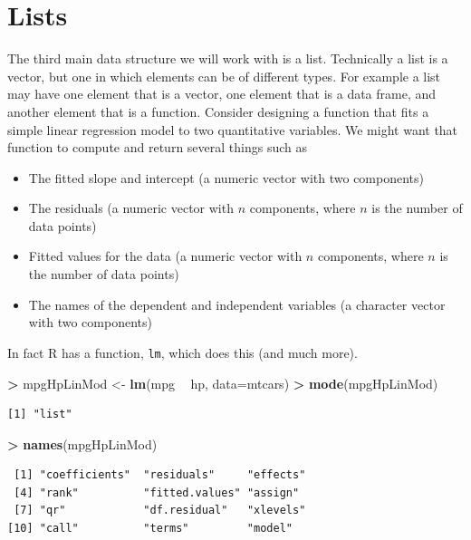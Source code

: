 \documentclass[]{krantz}
\makeatletter
\newenvironment{Shaded}{\begin{snugshade}}{\end{snugshade}}
\newcommand{\KeywordTok}[1]{\textcolor[rgb]{0.27,0.27,0.27}{\textbf{#1}}}
\newcommand{\DataTypeTok}[1]{\textcolor[rgb]{0.27,0.27,0.27}{#1}}
\newcommand{\StringTok}[1]{\textcolor[rgb]{0.5,0.5,0.5}{#1}}
\newcommand{\OperatorTok}[1]{\textcolor[rgb]{0.43,0.43,0.43}{\textbf{#1}}}
\newcommand{\NormalTok}[1]{#1}
\providecommand{\tightlist}{%
  \setlength{\itemsep}{0pt}\setlength{\parskip}{0pt}}
\newenvironment{kframe}{%
\medskip{}
\setlength{\fboxsep}{.8em}
 \def\at@end@of@kframe{}%
 \ifinner\ifhmode%
  \def\at@end@of@kframe{\end{minipage}}%
  \begin{minipage}{\columnwidth}%
 \fi\fi%
 \def\FrameCommand##1{\hskip\@totalleftmargin \hskip-\fboxsep
 \colorbox{shadecolor}{##1}\hskip-\fboxsep
     \hskip-\linewidth \hskip-\@totalleftmargin \hskip\columnwidth}%
 \MakeFramed {\advance\hsize-\width
   \@totalleftmargin\z@ \linewidth\hsize
   \@setminipage}}%
 {\par\unskip\endMakeFramed%
 \at@end@of@kframe}
\renewenvironment{Shaded}{\begin{kframe}}{\end{kframe}}
\makeatother
\begin{document}
\section{Lists}\label{lists}

The third main data structure we will work with is a list. Technically a
list is a vector, but one in which elements can be of different types.
For example a list may have one element that is a vector, one element
that is a data frame, and another element that is a function. Consider
designing a function that fits a simple linear regression model to two
quantitative variables. We might want that function to compute and
return several things such as

\begin{itemize}
\tightlist
\item
  The fitted slope and intercept (a numeric vector with two components)
\item
  The residuals (a numeric vector with \(n\) components, where \(n\) is
  the number of data points)
\item
  Fitted values for the data (a numeric vector with \(n\) components,
  where \(n\) is the number of data points)
\item
  The names of the dependent and independent variables (a character
  vector with two components)
\end{itemize}

In fact R has a function, \texttt{lm}, which does this (and much more).

\begin{Shaded}
\begin{Highlighting}[]
\OperatorTok{>}\StringTok{ }\NormalTok{mpgHpLinMod <-}\StringTok{ }\KeywordTok{lm}\NormalTok{(mpg }\OperatorTok{~}\StringTok{ }\NormalTok{hp, }\DataTypeTok{data=}\NormalTok{mtcars)}
\OperatorTok{>}\StringTok{ }\KeywordTok{mode}\NormalTok{(mpgHpLinMod)}
\end{Highlighting}
\end{Shaded}

\begin{verbatim}
[1] "list"
\end{verbatim}

\begin{Shaded}
\begin{Highlighting}[]
\OperatorTok{>}\StringTok{ }\KeywordTok{names}\NormalTok{(mpgHpLinMod)}
\end{Highlighting}
\end{Shaded}

\begin{verbatim}
 [1] "coefficients"  "residuals"     "effects"      
 [4] "rank"          "fitted.values" "assign"       
 [7] "qr"            "df.residual"   "xlevels"      
[10] "call"          "terms"         "model"        
\end{verbatim}
\end{document}
